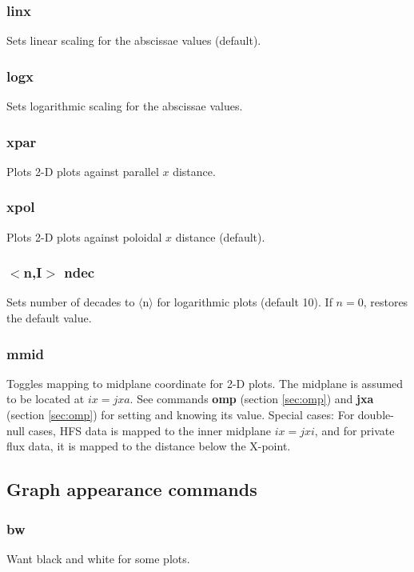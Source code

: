 \documentclass[a4paper,10pt]{report}
\begin{document}
\subsubsection{linx}\label{sec:linx}
Sets linear scaling for the abscissae values (default).

\subsubsection{logx}\label{sec:logx}
Sets logarithmic scaling for the abscissae values.

\subsubsection{xpar}\label{sec:xpar}
Plots 2-D plots against parallel $x$ distance.

\subsubsection{xpol}\label{sec:xpol}
Plots 2-D plots against poloidal $x$ distance (default).

\subsubsection{$<$n,{\bf I}$>$ ndec}\label{sec:ndec}
Sets number of decades to $\langle$n$\rangle$ for logarithmic plots (default 10).
If $n = 0$, restores the default value.

\subsubsection{mmid}\label{sec:mmid}
Toggles mapping to midplane coordinate for 2-D plots. The midplane
is assumed to be located at $ix=jxa$. See commands {\bf omp} (section \ref{sec:omp}) and
{\bf jxa} (section \ref{sec:omp}) for setting and knowing its value.
Special cases: For double-null cases, HFS data is mapped to the inner midplane
$ix=jxi$, and for private flux data, it is mapped to the distance below the
X-point.

\subsection{Graph appearance commands}\label{sec:graphappearance}

\subsubsection{bw}\label{sec:bw}
Want black and white for some plots.
\end{document}
